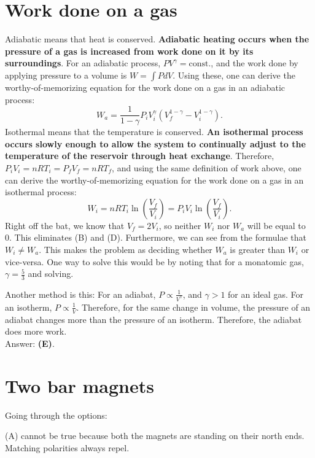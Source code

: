 \documentclass[11pt]{paper}
\newcommand{\answer}[1]{Answer: \textbf{(#1)}.}
\begin{document}
\section{Work done on a gas}
Adiabatic means that heat is conserved.  \textbf{Adiabatic heating occurs when the pressure of a gas is increased from work done on it by its surroundings}. For an adiabatic process, $PV^\gamma = \text{const.}$, and the work done by applying pressure to a volume is $W = \int P dV$.  Using these, one can derive the worthy-of-memorizing equation for the work done on a gas in an adiabatic process:
\begin{equation}
W_{a} = \frac{1}{1-\gamma}P_iV_i^\gamma\left(V_f^{1-\gamma} - V_i^{1-\gamma}\right).
\end{equation}
Isothermal means that the temperature is conserved.  \textbf{An isothermal process occurs slowly enough to allow the system to continually adjust to the temperature of the reservoir through heat exchange}. Therefore, $P_i V_i = n R T_i = P_f V_f = n R T_f$, and using the same definition of work above, one can derive the worthy-of-memorizing equation for the work done on a gas in an isothermal process:
\begin{equation}
W_{i} = n R T_i \ln \left( \frac{V_f}{V_i}\right) = P_i V_i \ln \left( \frac{V_f}{V_i}\right).
\end{equation}
Right off the bat, we know that $V_f = 2V_i$, so neither $W_i$ nor $W_a$ will be equal to 0.  This eliminates (B) and (D).  Furthermore, we can see from the formulae that $W_i \neq W_a$.  This makes the problem as deciding whether $W_a$ is greater than $W_i$ or vice-versa.  One way to solve this would be by noting that for a monatomic gas, $\gamma = \frac{5}{3}$ and solving.

Another method is this:  For an adiabat, $P \propto \frac{1}{V^\gamma}$, and $\gamma > 1$ for an ideal gas.  For an isotherm, $P \propto \frac{1}{V}$.  Therefore, for the same change in volume, the pressure of an adiabat changes more than the pressure of an isotherm.  Therefore, the adiabat does more work.\\

\answer{E}

\section{Two bar magnets}
Going through the options:

(A) cannot be true because both the magnets are standing on their north ends.  Matching polarities always repel.
\end{document}
